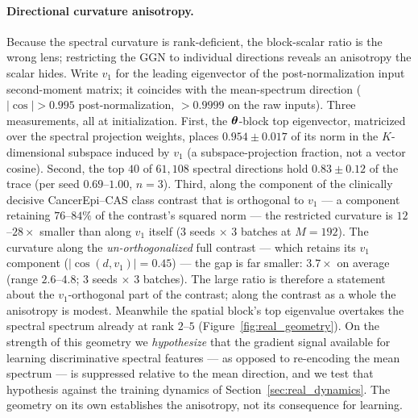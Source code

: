 \paragraph{Directional curvature anisotropy.}
Because the spectral curvature is rank-deficient, the block-scalar
ratio is the wrong lens; restricting the GGN to individual directions
reveals an anisotropy the scalar hides. Write $v_1$ for the leading
eigenvector of the post-normalization input second-moment matrix; it
coincides with the mean-spectrum direction ($|\cos| > 0.995$
post-normalization, $> 0.9999$ on the raw inputs). Three measurements,
all at initialization. First, the ${\boldsymbol{\theta}}$-block top eigenvector,
matricized over the spectral projection weights, places
$0.954 \pm 0.017$ of its norm in the $K$-dimensional subspace induced
by $v_1$ (a subspace-projection fraction, not a vector cosine).
Second, the top $40$ of $61{,}108$ spectral directions hold
$0.83 \pm 0.12$ of the trace (per seed $0.69$--$1.00$, $n=3$). Third,
along the component of the clinically decisive CancerEpi--CAS class
contrast that is orthogonal to $v_1$ --- a component retaining
$76$--$84\%$ of the contrast's squared norm --- the restricted
curvature is $12$--$28\times$ smaller than along $v_1$ itself
(3 seeds $\times$ 3 batches at $M{=}192$). The curvature along the
\emph{un-orthogonalized} full contrast --- which retains its $v_1$
component ($|\cos(d, v_1)| = 0.45$) --- the gap is far smaller:
$3.7\times$ on average (range $2.6$--$4.8$; 3 seeds $\times$ 3 batches).
The large ratio is therefore a statement about the $v_1$-orthogonal part
of the contrast; along the contrast as a whole the anisotropy is modest.
Meanwhile the
spatial
block's top eigenvalue overtakes the spectral spectrum already at rank
$2$--$5$ (Figure~\ref{fig:real_geometry}). On the strength of this
geometry we \emph{hypothesize} that the gradient signal available for
learning discriminative spectral features --- as opposed to re-encoding
the mean spectrum --- is suppressed relative to the mean direction, and
we test that hypothesis against the training dynamics of
Section~\ref{sec:real_dynamics}. The geometry on its own establishes
the anisotropy, not its consequence for learning.

